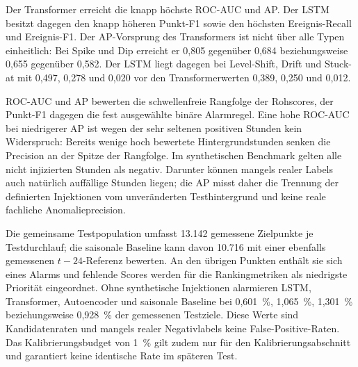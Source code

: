 \begin{table}[htb]
  \centering
  \caption{Gemeinsamer Vergleich auf starken künstlichen Anomalien. Eigene
    Darstellung.}
  \label{tab:model_comparison}
\end{table}

Der Transformer erreicht die knapp höchste ROC-AUC und AP. Der LSTM besitzt
dagegen den knapp höheren Punkt-F1 sowie den höchsten Ereignis-Recall und
Ereignis-F1. Der AP-Vorsprung des Transformers ist nicht über alle Typen
einheitlich: Bei Spike und Dip erreicht er 0{,}805 gegenüber 0{,}684
beziehungsweise 0{,}655 gegenüber 0{,}582. Der LSTM liegt dagegen bei
Level-Shift, Drift und Stuck-at mit 0{,}497, 0{,}278 und 0{,}020 vor den
Transformerwerten 0{,}389, 0{,}250 und 0{,}012.

ROC-AUC und AP bewerten die schwellenfreie Rangfolge der Rohscores, der
Punkt-F1 dagegen die fest ausgewählte binäre Alarmregel. Eine hohe ROC-AUC bei
niedrigerer AP ist wegen der sehr seltenen positiven Stunden kein Widerspruch:
Bereits wenige hoch bewertete Hintergrundstunden senken die Precision an der
Spitze der Rangfolge. Im synthetischen Benchmark gelten alle nicht injizierten
Stunden als negativ. Darunter können mangels realer Labels auch natürlich
auffällige Stunden liegen; die AP misst daher die Trennung der definierten
Injektionen vom unveränderten Testhintergrund und keine reale fachliche
Anomalieprecision.

Die gemeinsame Testpopulation umfasst 13.142 gemessene
Zielpunkte je Testdurchlauf; die saisonale Baseline kann davon 10.716 mit einer
ebenfalls gemessenen $t-24$-Referenz bewerten. An den übrigen Punkten enthält
sie
sich eines Alarms und fehlende Scores werden für die Rankingmetriken als
niedrigste Priorität eingeordnet. Ohne synthetische Injektionen alarmieren
LSTM,
Transformer, Autoencoder und saisonale Baseline bei 0{,}601~\%, 1{,}065~\%,
1{,}301~\% beziehungsweise 0{,}928~\% der gemessenen Testziele.
Diese Werte sind Kandidatenraten und mangels realer Negativlabels keine
False-Positive-Raten. Das Kalibrierungsbudget von 1~\% gilt zudem nur für den
Kalibrierungsabschnitt und garantiert keine identische Rate im späteren Test.

